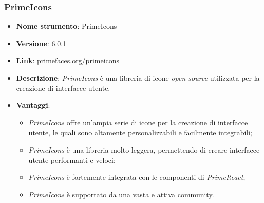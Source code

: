 \subsubsection{PrimeIcons}
\begin{itemize}
      \item \textbf{Nome strumento}: PrimeIcons
      \item \textbf{Versione}: 6.0.1
      \item \textbf{Link}: \href{https://primefaces.org/primeicons}{primefaces.org/primeicons}
      \item \textbf{Descrizione}: \textit{PrimeIcons} è una libreria di icone \textit{open-source} utilizzata per la creazione di interfacce utente.
      \item \textbf{Vantaggi}:
            \begin{itemize}
                  \item \textit{PrimeIcons} offre un'ampia serie di icone per la creazione di interfacce utente, le quali sono altamente personalizzabili e facilmente integrabili;
                  \item \textit{PrimeIcons} è una libreria molto leggera, permettendo di creare interfacce utente performanti e veloci;
                  \item \textit{PrimeIcons} è fortemente integrata con le componenti di \textit{PrimeReact};
                  \item \textit{PrimeIcons} è supportato da una vasta e attiva community.
            \end{itemize}
\end{itemize}

